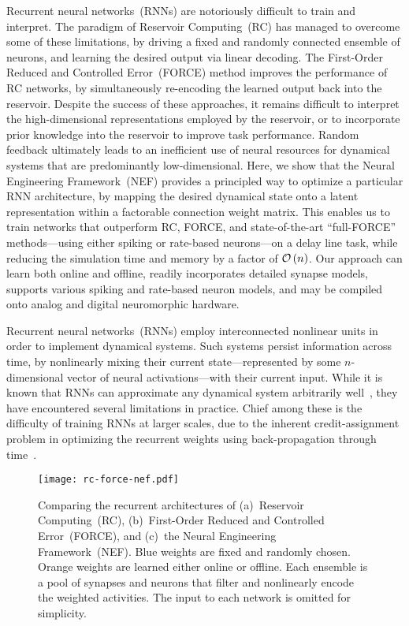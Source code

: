 Recurrent neural networks~(RNNs) are notoriously difficult to train and interpret.
The paradigm of Reservoir Computing~(RC) has managed to overcome some of these limitations, by driving a fixed and randomly connected ensemble of neurons, and learning the desired output via linear decoding.
The First-Order Reduced and Controlled Error~(FORCE) method improves the performance of RC networks, by simultaneously re-encoding the learned output back into the reservoir. 
Despite the success of these approaches, it remains difficult to interpret the high-dimensional representations employed by the reservoir, or to incorporate prior knowledge into the reservoir to improve task performance.
Random feedback ultimately leads to an inefficient use of neural resources for dynamical systems that are predominantly low-dimensional.
Here, we show that the Neural Engineering Framework~(NEF) provides a principled way to optimize a particular RNN architecture, by mapping the desired dynamical state onto a latent representation within a factorable connection weight matrix.
This enables us to train networks that outperform RC, FORCE, and state-of-the-art ``full-FORCE'' methods---using either spiking or rate-based neurons---on a delay line task, while reducing the simulation time and memory by a factor of $\mathcal{O}\left({n}\right)$.
Our approach can learn both online and offline, readily incorporates detailed synapse models, supports various spiking and rate-based neuron models, and may be compiled onto analog and digital neuromorphic hardware.

Recurrent neural networks~(RNNs) employ interconnected nonlinear units in order to implement dynamical systems.
Such systems persist information across time, by nonlinearly mixing their current state---represented by some $n$-dimensional vector of neural activations---with their current input.
While it is known that RNNs can approximate any dynamical system arbitrarily well~\citep{funahashi1993approximation}, they have encountered several limitations in practice.
Chief among these is the difficulty of training RNNs at larger scales, due to the inherent credit-assignment problem in optimizing the recurrent weights using back-propagation through time~\citep{bengio1994learning}.

\begin{figure}
  \centering
  \texttt{[image: rc-force-nef.pdf]}
  \caption{ \label{fig:architectures}
    Comparing the recurrent architectures of (a)~Reservoir Computing~(RC), (b)~First-Order Reduced and Controlled Error~(FORCE), and (c)~the Neural Engineering Framework~(NEF).
    Blue weights are fixed and randomly chosen.
    Orange weights are learned either online or offline.
    Each ensemble is a pool of synapses and neurons that filter and nonlinearly encode the weighted activities.
    The input to each network is omitted for simplicity.
  }
\end{figure}

